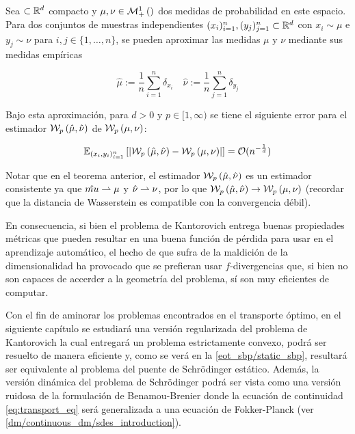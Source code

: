 \begin{teo}[Dudley]
	Sea $\subset\mathbb{R}^d$ compacto y $\mu,\nu\in\mathcal{M}_+^1\left(\right)$ dos medidas de probabilidad en este espacio. Para dos conjuntos de muestras independientes $(x_i)_{i=1}^n, (y_j)_{j=1}^n\subset\mathbb{R}^d$ con $x_i\sim\mu$ e $y_j\sim\nu$ para $i,j\in\{1,\ldots,n\}$, se pueden aproximar las medidas $\mu$ y $\nu$ mediante sus medidas empíricas

	\begin{equation}
		\hat{\mu} := \frac{1}{n} \sum_{i=1}^n \delta_{x_i}
		\quad
		\hat{\nu} := \frac{1}{n} \sum_{j=1}^n \delta_{y_j}
	\end{equation}

	Bajo esta aproximación, para $d>0$ y $p\in[1,\infty)$ se tiene el siguiente error para el estimador $\mathcal{W}_{p}\left(\hat{\mu}, \hat{\nu}\right)$ de $\mathcal{W}_{p}\left(\mu,\nu\right)$:

	\begin{equation}
		\mathbb{E}_{(x_i,y_i)_{i=1}^n}\left[\left|\mathcal{W}_{p}\left(\hat{\mu}, \hat{\nu}\right) - \mathcal{W}_{p}\left(\mu,\nu\right) \right|\right] = \mathcal{O}(n^{-\frac{1}{d}})
	\end{equation}
\end{teo}

Notar que en el teorema anterior, el estimador $\mathcal{W}_{p}\left(\hat{\mu}, \hat{\nu}\right)$ es un estimador consistente ya que $\hat{mu}\rightharpoonup \mu$ y $\hat{\nu}\rightharpoonup\nu$, por lo que $\mathcal{W}_{p}\left(\hat{\mu}, \hat{\nu}\right) \to \mathcal{W}_{p}\left(\mu,\nu\right)$ (recordar que la distancia de Wasserstein es compatible con la convergencia débil).

En consecuencia, si bien el problema de Kantorovich entrega buenas propiedades métricas que pueden resultar en una buena función de pérdida para usar en el aprendizaje automático, el hecho de que sufra de la maldición de la dimensionalidad ha provocado que se prefieran usar $f$-divergencias que, si bien no son capaces de accerder a la geometría del problema, sí son muy eficientes de computar.

Con el fin de aminorar los problemas encontrados en el transporte óptimo, en el siguiente capítulo se estudiará una versión regularizada del problema de Kantorovich la cual entregará un problema estrictamente convexo, podrá ser resuelto de manera eficiente y, como se verá en la \autoref{eot_sbp/static_sbp}, resultará ser equivalente al problema del puente de Schrödinger estático. Además, la versión dinámica del problema de Schrödinger podrá ser vista como una versión ruidosa de la formulación de Benamou-Brenier donde la ecuación de continuidad \eqref{eq:transport_eq} será generalizada a una ecuación de Fokker-Planck (ver \autoref{dm/continuous_dm/sdes_introduction}).